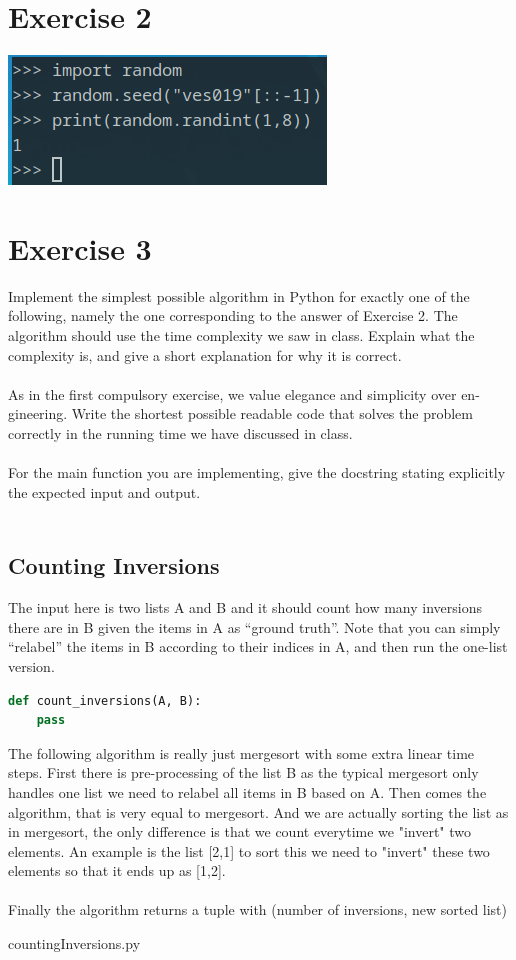 \documentclass{article}
\begin{document}
\section{Exercise 2}
\includegraphics[scale=0.5]
{task-random.png}

\section{Exercise 3}
Implement the simplest possible algorithm in Python for exactly one of the
following, namely the one corresponding to the answer of Exercise 2. The
algorithm should use the time complexity we saw in class. Explain what the
complexity is, and give a short explanation for why it is correct.\\\\
As in the first compulsory exercise, we value elegance and simplicity over en-
gineering. Write the shortest possible readable code that solves the problem
correctly in the running time we have discussed in class.\\\\
For the main function you are implementing, give the docstring stating explicitly
the expected input and output.\\\\

\subsection{Counting Inversions}
The input here is two lists A and B and it should count how many inversions
there are in B given the items in A as “ground truth”. Note that you can simply
“relabel” the items in B according to their indices in A, and then run the one-list
version.\\
\begin{lstlisting}[language=Python]
def count_inversions(A, B):
    pass
\end{lstlisting}
The following algorithm is really just mergesort with some extra linear time steps. First there is pre-processing of the list B as the typical mergesort only handles one list we need to relabel all items in B based on A. Then comes the algorithm, that is very equal to mergesort. And we are actually sorting the list as in mergesort, the only difference is that we count everytime we "invert" two elements. An example is the list [2,1] to sort this we need to "invert" these two elements so that it ends up as [1,2]. 
\\ \\
Finally the algorithm returns a tuple with (number of inversions, new sorted list)

{countingInversions.py}
\end{document}

